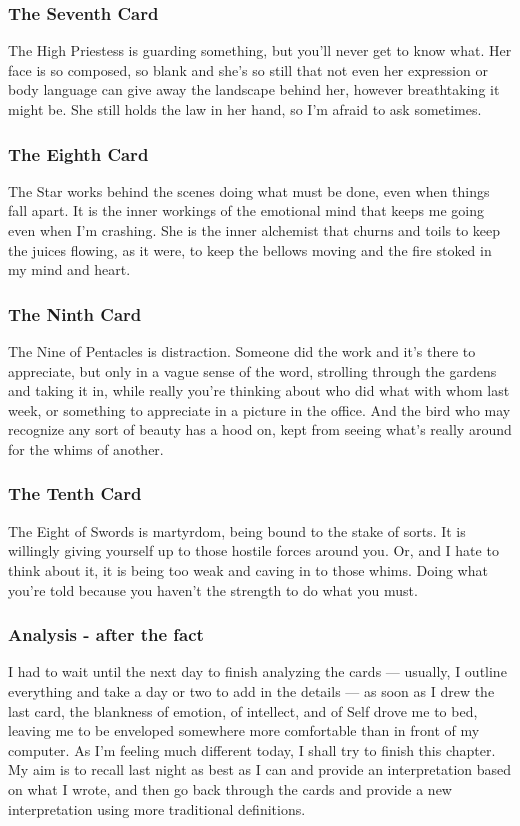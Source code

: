 \subsubsection*{The Seventh Card}
The High Priestess is guarding something, but you'll never get to know
what.  Her face is so composed, so blank and she's so still that not
even her expression or body language can give away the landscape behind
her, however breathtaking it might be.  She still holds the law in her
hand, so I'm afraid to ask sometimes.

\subsubsection*{The Eighth Card}
The Star works behind the scenes doing what must be done, even when
things fall apart.  It is the inner workings of the emotional mind that
keeps me going even when I'm crashing.  She is the inner alchemist that
churns and toils to keep the juices flowing, as it were, to keep the
bellows moving and the fire stoked in my mind and heart.

\subsubsection*{The Ninth Card}
The Nine of Pentacles is distraction.  Someone did the work and it's
there to appreciate, but only in a vague sense of the word, strolling
through the gardens and taking it in, while really you're thinking about
who did what with whom last week, or something to appreciate in a
picture in the office.  And the bird who may recognize any sort of
beauty has a hood on, kept from seeing what's really around for the
whims of another.

\subsubsection*{The Tenth Card}
The Eight of Swords is martyrdom, being bound to the stake of sorts.  It
is willingly giving yourself up to those hostile forces around you.  Or,
and I hate to think about it, it is being too weak and caving in to
those whims.  Doing what you're told because you haven't the strength to
do what you must.

\subsubsection*{Analysis - after the fact}
I had to wait until the next day to finish analyzing the cards ---
usually, I outline everything and take a day or two to add in the
details --- as soon as I drew the last card, the blankness of emotion,
of intellect, and of Self drove me to bed, leaving me to be enveloped
somewhere more comfortable than in front of my computer.  As I'm feeling
much different today, I shall try to finish this chapter.  My aim is to
recall last night as best as I can and provide an interpretation based
on what I wrote, and then go back through the cards and provide a new
interpretation using more traditional definitions.

